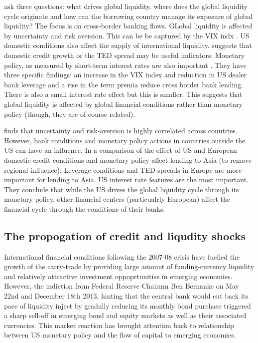 \documentclass[12pt, a4paper, oneside]{article} %
\begin{document}
\citet{Cerutti2014} ask three questions:  what drives global liquidity. where does the global liquidity cycle originate and how can the borrowing country manage its exposure of global liquidity? The focus is on cross-border banking flows. GLobal liquidity is affected by uncertainty and risk aversion.  This can be be captured by the VIX indx \citet{Rey2013}. US domestic conditions also affect the supply of international liquidity.  \citet{Bruno2014} suggests that domestic credit growth or the TED spread may be useful indicators. Monetary policy, as measured by short-term interest rates are also important \citet{Cerutti2014}. They have three specific findings:  an increase in the VIX index and reduction in US dealer bank leverage and a rise in the term premia reduce cross border bank lending.  There is also a small interest rate effect but this is smaller.  This suggests that global liquidity is affected by global financial conditions rather than monetary policy (though, they are of course related). 

\citet{Cerutti2014} finds that uncertainty and risk-aversion is highly correlated across countries. However, bank conditions and monetary policy actions in countries outside the US can have an influence. In a comparison of the effect of US and European domestic credit conditions and monetary policy affect lending to Asia (to remove regional influence).  Leverage conditions and TED spreads in Europe are more important for lending to Asia.  US interest rate features are the most important. They conclude that while the US drives the global liquidity cycle through its monetary policy, other financial centers (particualrly European) affect the financial cycle through the conditions of their banks. 


\subsection{The propogation of credit and liqudity shocks}
International financial conditions following the 2007-08 crisis have fuelled the growth of the carry-trade by providing large amount of funding-currency liquidity and relatively attractive investment oppoprtunities in emerging economies. However, the indiction from Federal Reserve Chairmn Ben Bernanke on May 22nd and December 18th 2013, hinting that the central bank would cut back its pace of liquidity inject by gradully reducing its monthly bond purchase triggered a sharp sell-off in emerging bond and equity markets as well as their associated currencies.  This market reaction has brought attention back to relationship between US monetary policy and the flow of capital to emerging economies.  
\end{document}
